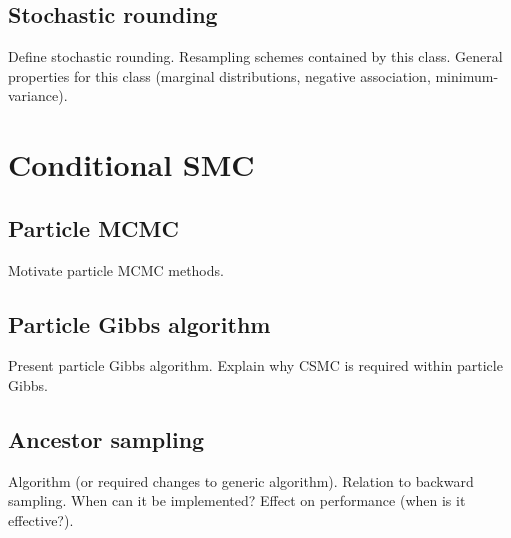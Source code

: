 \subsection{Stochastic rounding}
Define stochastic rounding. Resampling schemes contained by this class. General properties for this class (marginal distributions, negative association, minimum-variance).


\section{Conditional SMC}

\subsection{Particle MCMC}
Motivate particle MCMC methods. 

\subsection{Particle Gibbs algorithm}
Present particle Gibbs algorithm. Explain why CSMC is required within particle Gibbs.

\subsection{Ancestor sampling}
Algorithm (or required changes to generic algorithm). Relation to backward sampling. When can it be implemented? Effect on performance (when is it effective?).
